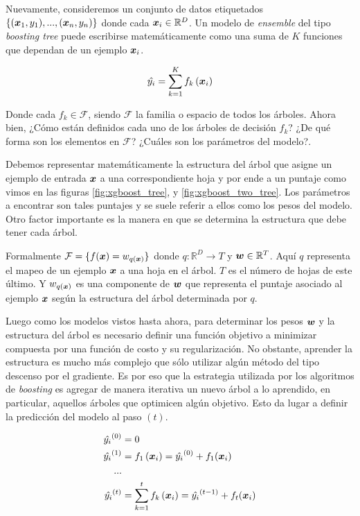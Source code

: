 Nuevamente, consideremos un conjunto de datos etiquetados $\{(\boldsymbol{x}_1, y_1),
..., (\boldsymbol{x}_n, y_n)\}$ donde cada $\boldsymbol{x}_i \in \mathbb{R}^{D}$. Un
modelo de \emph{ensemble} del tipo \emph{boosting tree} puede escribirse
matemáticamente como una suma de $K$ funciones que dependan de un ejemplo
$\boldsymbol{x}_i$.

\begin{equation} \label{eq:xgb-model-1}
    \hat{y_{i}} = \sum_{k=1}^{K} f_{k} \left( \boldsymbol{x}_{i}\right)
\end{equation}

Donde cada $f_k \in \mathcal{F}$, siendo $\mathcal{F}$ la familia o espacio de
todos los árboles. Ahora bien, ¿Cómo están definidos cada uno de los árboles de
decisión $f_k$? ¿De qué forma son los elementos en $\mathcal{F}$? ¿Cuáles son los
parámetros del modelo?.

Debemos representar matemáticamente la estructura del árbol que asigne un
ejemplo de entrada $\boldsymbol{x}$ a una correspondiente hoja y por ende a un puntaje
como vimos en las figuras \ref{fig:xgboost_tree}, y \ref{fig:xgboost_two_tree}.
Los parámetros a encontrar son tales puntajes y se suele referir a ellos como
los pesos del modelo. Otro factor importante es la manera en que se determina la
estructura que debe tener cada árbol.

Formalmente $\mathcal{F} = \{f(\boldsymbol{x}) = w_{q\left( \boldsymbol{x} \right)}\}$ donde
$q : \mathbb{R}^{D} \rightarrow T$ y $\boldsymbol{w} \in \mathbb{R}^{T}$. Aquí $q$
representa el mapeo de un ejemplo $\boldsymbol{x}$ a una hoja en el árbol. $T$ es el
número de hojas de este último. Y $w_{q\left( \boldsymbol{x} \right)}$ es una
componente de $\boldsymbol{w}$ que representa el puntaje asociado al ejemplo
$\boldsymbol{x}$ según la estructura del árbol determinada por $q$.

Luego como los modelos vistos hasta ahora, para determinar los pesos $\boldsymbol{w}$
y la estructura del árbol es necesario definir una función objetivo a minimizar
compuesta por una función de costo y su regularización. No obstante, aprender la
estructura es mucho más complejo que sólo utilizar algún método del tipo
descenso por el gradiente. Es por eso que la estrategia utilizada por los
algoritmos de \emph{boosting} es agregar de manera iterativa un nuevo árbol a lo
aprendido, en particular, aquellos árboles que optimicen algún objetivo. Esto da
lugar a definir la predicción del modelo al paso $(t)$.

\begin{align*}
    \hat{y_i}^{(0)} &= 0 \\
    \hat{y_i}^{(1)} &= f_{1}\left( \boldsymbol{x}_i \right) = \hat{y_i}^{(0)} + f_1{(\boldsymbol{x}_i)} \\
    ... \\
    \hat{y_i}^{(t)} &= \sum_{k=1}^{t} f_{k} \left( \boldsymbol{x}_{i}\right) = \hat{y_i}^{(t - 1)} + f_t{(\boldsymbol{x}_i)}
\end{align*}

